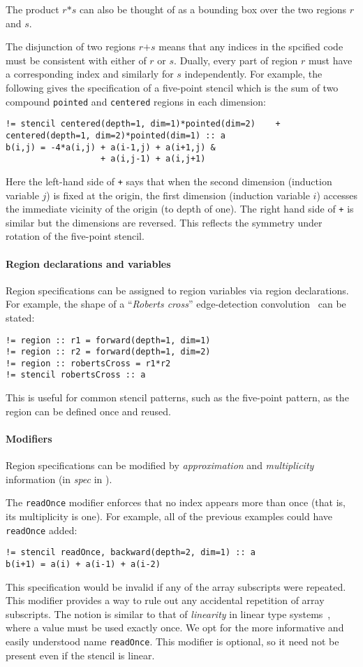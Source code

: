 \documentclass[10pt,preprint,numbers]{sigplanconf}
\theoremstyle{definition}
\newcommand{\term}[1]{\texttt{#1}}
\begin{document}
The product $r \term{*} s$ can also be thought of as a bounding box
over the two regions $r$ and $s$.

The disjunction of two regions $r \term{+} s$ means that any indices
in the spcified code must be consistent with either of $r$ or $s$.
Dually, every part of region $r$ must have a
corresponding index and similarly for $s$ independently. For
example, the following gives the specification of a five-point
stencil which is the sum of two compound \texttt{pointed} and
\texttt{centered} regions in each dimension:
%
\begin{verbatim}
!= stencil centered(depth=1, dim=1)*pointed(dim=2)    + centered(depth=1, dim=2)*pointed(dim=1) :: a
b(i,j) = -4*a(i,j) + a(i-1,j) + a(i+1,j) &
                   + a(i,j-1) + a(i,j+1)
\end{verbatim}
Here the left-hand side of \texttt{+} says that when the second dimension
(induction variable $j$) is fixed at the origin, the first dimension
(induction variable $i$) accesses the immediate vicinity of the origin
(to depth of one). The right hand side of \texttt{+} is similar but the dimensions are reversed.
This reflects the symmetry under rotation of the five-point stencil.

\paragraph{Region declarations and variables}

Region specifications can be assigned to region variables via
region declarations. For example, the shape of a
``\emph{Roberts cross}'' edge-detection convolution~\cite{davis1975survey}
can be stated:
\begin{verbatim}
!= region :: r1 = forward(depth=1, dim=1)
!= region :: r2 = forward(depth=1, dim=2)
!= region :: robertsCross = r1*r2
!= stencil robertsCross :: a
\end{verbatim}
This is useful for common stencil patterns, such as the five-point
pattern, as the region can be defined once and reused.
\paragraph{Modifiers}
Region specifications can be modified
by \emph{approximation} and \emph{multiplicity} information
(in \textit{spec} in ).

The \texttt{readOnce} modifier enforces that no index appears more
than once (that is, its multiplicity is one). For example, all of
the previous examples could have \texttt{readOnce} added:
%
\begin{verbatim}
!= stencil readOnce, backward(depth=2, dim=1) :: a
b(i+1) = a(i) + a(i-1) + a(i-2)
\end{verbatim}
%
This specification would be invalid if any of the
array subscripts were repeated. This modifier provides a way to
rule out any accidental repetition of array subscripts.
The notion is similar to that of \emph{linearity} in linear type
systems~\cite{wadler1990linear}, where a value must be used
exactly once. We opt for the more informative and easily understood name
\texttt{readOnce}. This modifier is optional, so it need not
be present even if the stencil is linear.
\end{document}
